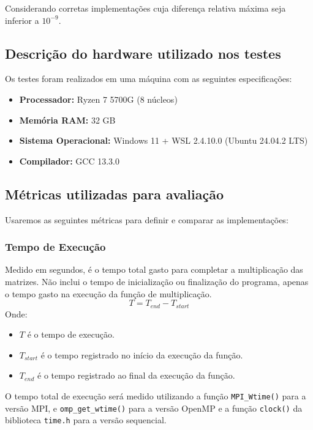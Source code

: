 \documentclass[12pt, a4paper]{article}
\begin{document}
    Considerando corretas implementações cuja diferença relativa máxima seja inferior a $10^{-9}$.

    \subsection{Descrição do hardware utilizado nos testes}

    Os testes foram realizados em uma máquina com as seguintes especificações:
    \begin{itemize}
        \item \textbf{Processador:} Ryzen 7 5700G (8 núcleos)
        \item \textbf{Memória RAM:} 32 GB
        \item \textbf{Sistema Operacional:} Windows 11 + WSL 2.4.10.0 (Ubuntu 24.04.2 LTS)
        \item \textbf{Compilador:} GCC 13.3.0
    \end{itemize}

    \subsection{Métricas utilizadas para avaliação}
	
    Usaremos as seguintes métricas para definir e comparar as implementações:

    \subsubsection{Tempo de Execução}

    Medido em segundos, é o tempo total gasto para completar a multiplicação das matrizes. Não inclui o tempo de inicialização ou finalização do programa, apenas o tempo gasto na execução da função de multiplicação.
    \[
        T = T_{end} - T_{start}
    \]
    Onde:
    \begin{itemize}
        \item $T$ é o tempo de execução.
        \item $T_{start}$ é o tempo registrado no início da execução da função.
        \item $T_{end}$ é o tempo registrado ao final da execução da função.
    \end{itemize}

    O tempo total de execução será medido utilizando a função \texttt{MPI\_Wtime()} para a versão MPI, e \texttt{omp\_get\_wtime()} para a versão OpenMP e a função \texttt{clock()} da biblioteca \texttt{time.h} para a versão sequencial.
\end{document}
